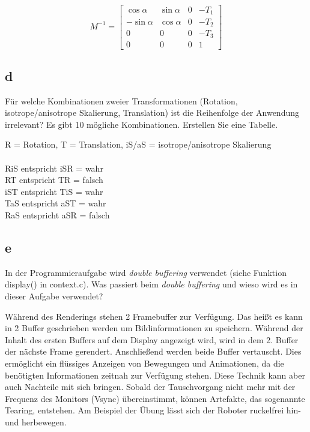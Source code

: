 \documentclass[12pt]{scrreprt}
\begin{document}
\[
 M^{-1} = \begin{bmatrix}
       \cos \alpha & \sin\alpha & 0 & -T_1 \\[0.3em]
       -\sin\alpha & \cos\alpha & 0 & -T_2 \\[0.3em]
       0           & 0          & 0 & -T_3 \\[0.3em]
       0           & 0          & 0 & 1
     \end{bmatrix}
\]

\subsection*{d}

Für welche Kombinationen zweier Transformationen (Rotation, isotrope/anisotrope Skalierung,
Translation) ist die Reihenfolge der Anwendung irrelevant? Es gibt 10 mögliche Kombinationen. Erstellen
Sie eine Tabelle.

R = Rotation, T = Translation,  iS/aS = isotrope/anisotrope Skalierung\\
\\
RiS entspricht iSR = wahr\\
RT entspricht TR   = falsch\\
iST entspricht TiS = wahr\\
TaS entspricht aST = wahr\\
RaS entspricht aSR = falsch\\

\subsection*{e}

In der Programmieraufgabe wird \emph{double buffering} verwendet (siehe Funktion display() in
context.c). Was passiert beim \emph{double buffering} und wieso wird es in dieser Aufgabe verwendet?

Während des Renderings stehen 2 Framebuffer zur Verfügung. Das heißt es kann in 2 Buffer geschrieben werden um Bildinformationen zu speichern. Während der Inhalt des ersten Buffers auf dem Display angezeigt wird, wird in dem 2. Buffer der nächste Frame gerendert. Anschließend werden beide Buffer vertauscht. Dies ermöglicht ein flüssiges Anzeigen von Bewegungen und Animationen, da die benötigten Informationen zeitnah zur Verfügung stehen. Diese Technik kann aber auch Nachteile mit sich bringen. Sobald der Tauschvorgang nicht mehr mit der Frequenz des Monitors (Vsync) übereinstimmt, können Artefakte, das sogenannte Tearing, entstehen. Am Beispiel der Übung lässt sich der Roboter ruckelfrei hin- und herbewegen.
\end{document}
